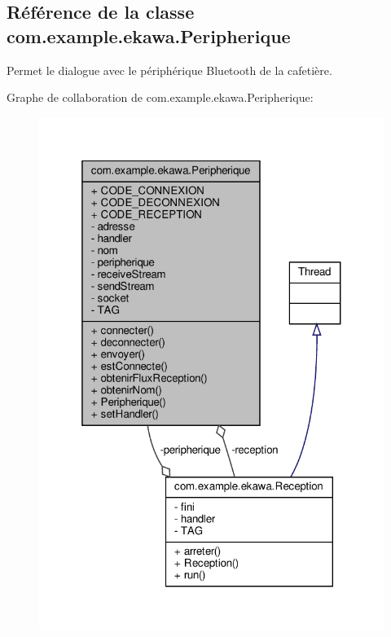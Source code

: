 \hypertarget{classcom_1_1example_1_1ekawa_1_1_peripherique}{}\subsection{Référence de la classe com.\+example.\+ekawa.\+Peripherique}
\label{classcom_1_1example_1_1ekawa_1_1_peripherique}


Permet le dialogue avec le périphérique Bluetooth de la cafetière.  




Graphe de collaboration de com.\+example.\+ekawa.\+Peripherique\+:\nopagebreak
\begin{figure}[H]
\begin{center}
\leavevmode
\includegraphics[width=319pt]{classcom_1_1example_1_1ekawa_1_1_peripherique__coll__graph}
\end{center}
\end{figure}
